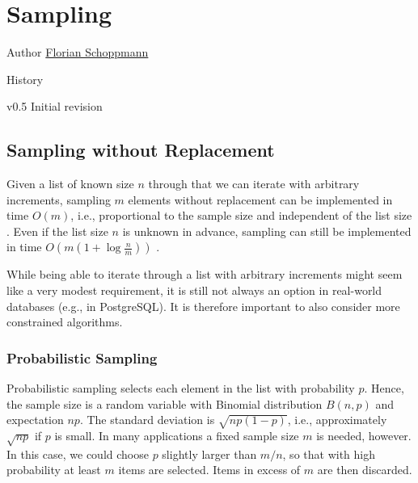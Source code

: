 
\chapter{Sampling}

\begin{moduleinfo}
\item[Author] \href{mailto:Florian.Schoppmann@emc.com}{Florian Schoppmann}
\item[History]
	\begin{modulehistory}
		\item[v0.5] Initial revision
	\end{modulehistory}
\end{moduleinfo}

\section{Sampling without Replacement} \label{sec:SampingWOReplacement}

Given a list of known size $n$ through that we can iterate with arbitrary increments, sampling $m$ elements without replacement can be implemented in time $O(m)$, i.e., proportional to the sample size and independent of the list size \cite{V84a}. Even if the list size $n$ is unknown in advance, sampling can still be implemented in time $O(m(1 + \log \frac nm))$ \cite{V85a}.

While being able to iterate through a list with arbitrary increments might seem like a very modest requirement, it is still not always an option in real-world databases (e.g., in PostgreSQL). It is therefore important to also consider more constrained algorithms.

\subsection{Probabilistic Sampling}

Probabilistic sampling selects each element in the list with probability $p$. Hence, the sample size is a random variable with Binomial distribution $B(n, p)$ and expectation $np$. The standard deviation is $\sqrt{np(1 - p)}$, i.e., approximately $\sqrt{np}$ if $p$ is small. In many applications a fixed sample size $m$ is needed, however. In this case, we could choose $p$ slightly larger than $m/n$, so that with high probability at least $m$ items are selected. Items in excess of $m$ are then discarded.


